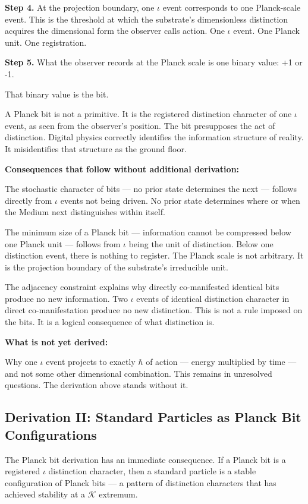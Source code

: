 \documentclass[11pt,letterpaper]{article}
\newcommand{\Kappa}{\mathcal{K}}
\begin{document}
\textbf{Step 4.} At the projection boundary, one \(\iota\) event corresponds to one Planck-scale event. This is the threshold at which the substrate's dimensionless distinction acquires the dimensional form the observer calls action. One \(\iota\) event. One Planck unit. One registration.

\textbf{Step 5.} What the observer records at the Planck scale is one binary value: +1 or -1.

That binary value is the bit.

A Planck bit is not a primitive. It is the registered distinction character of one \(\iota\) event, as seen from the observer's position. The bit presupposes the act of distinction. Digital physics correctly identifies the information structure of reality. It misidentifies that structure as the ground floor.

\textbf{Consequences that follow without additional derivation:}

The stochastic character of bits --- no prior state determines the next --- follows directly from \(\iota\) events not being driven. No prior state determines where or when the Medium next distinguishes within itself.

The minimum size of a Planck bit --- information cannot be compressed below one Planck unit --- follows from \(\iota\) being the unit of distinction. Below one distinction event, there is nothing to register. The Planck scale is not arbitrary. It is the projection boundary of the substrate's irreducible unit.

The adjacency constraint explains why directly co-manifested identical bits produce no new information. Two \(\iota\) events of identical distinction character in direct co-manifestation produce no new distinction. This is not a rule imposed on the bits. It is a logical consequence of what distinction is.

\textbf{What is not yet derived:}

Why one \(\iota\) event projects to exactly \(\hbar\) of action --- energy multiplied by time --- and not some other dimensional combination. This remains in unresolved questions. The derivation above stands without it.

\subsection{Derivation II: Standard Particles as Planck Bit Configurations}
\label{sec:orgcb94592}


The Planck bit derivation has an immediate consequence. If a Planck bit is a registered \(\iota\) distinction character, then a standard particle is a stable configuration of Planck bits --- a pattern of distinction characters that has achieved stability at a \(\Kappa\) extremum.
\end{document}
